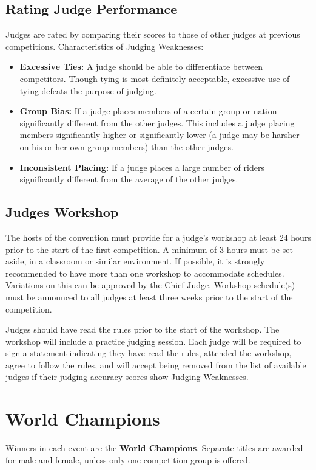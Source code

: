 \subsection{Rating Judge Performance}
Judges are rated by comparing their scores to those of other judges at previous competitions.
Characteristics of Judging Weaknesses:
\begin{itemize}
\item \textbf{Excessive Ties:}
A judge should be able to differentiate between competitors.
Though tying is most definitely acceptable, excessive use of tying defeats the purpose of judging.
\item \textbf{Group Bias:}
If a judge places members of a certain group or nation significantly different from the other judges.
This includes a judge placing members significantly higher or significantly lower (a judge may be harsher on his or her own group members) than the other judges.
\item\textbf{Inconsistent Placing:}
If a judge places a large number of riders significantly different from the average of the other judges.
\end{itemize}

\subsection{Judges Workshop}
The hosts of the convention must provide for a judge's workshop at least 24 hours prior to the start of the first competition.
A minimum of 3 hours must be set aside, in a classroom or similar environment.
If possible, it is strongly recommended to have more than one workshop to accommodate schedules.
Variations on this can be approved by the Chief Judge.
Workshop schedule(s) must be announced to all judges at least three weeks prior to the start of the competition.

Judges should have read the rules prior to the start of the workshop.
The workshop will include a practice judging session.
Each judge will be required to sign a statement indicating they have read the rules, attended the workshop, agree to follow the rules, and will accept being removed from the list of available judges if their judging accuracy scores show Judging Weaknesses.

\section{World Champions}
Winners in each event are the \textbf{World Champions}. Separate titles are awarded for male and female, unless only one competition group is offered.


